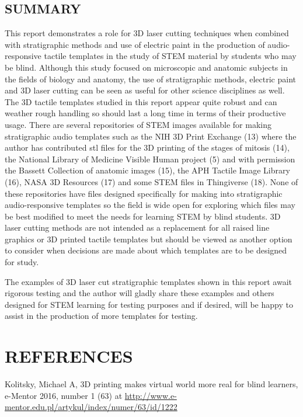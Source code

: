 \documentclass[11.5pt]{sig-alternate} %
\begin{document}
\begin{large}
\section*{SUMMARY}
This report demonstrates a role for 3D laser cutting techniques when combined with stratigraphic methods and use of electric paint in the production of audio-responsive tactile templates in the study of STEM material by students who may be blind.  Although this study focused on microscopic and anatomic subjects in the fields of biology and anatomy, the use of stratigraphic methods, electric paint and 3D laser cutting can be seen as useful for other science disciplines as well.  The 3D tactile templates studied in this report appear quite robust and can weather rough handling so should last a long time in terms of their productive usage.  There are several repositories of STEM images available for making stratigraphic audio templates such as the NIH 3D Print Exchange (13) where the author has contributed stl files for the 3D printing of the stages of mitosis (14), the National Library of Medicine Visible Human project (5) and with permission the Bassett Collection of anatomic images (15), the APH Tactile Image Library (16), NASA 3D Resources (17) and some STEM files in Thingiverse (18).  None of these repositories have files designed specifically for making into stratigraphic audio-responsive templates so the field is wide open for exploring which files may be best modified to meet the needs for learning STEM by blind students.  3D laser cutting methods are not intended as a replacement for all raised line graphics or 3D printed tactile templates but should be viewed as another option to consider when decisions are made about which templates are to be designed for study.

The examples of 3D laser cut stratigraphic templates shown in this report await rigorous testing and the author will gladly share these examples and others designed for STEM learning for testing purposes and if desired, will be happy to assist in the production of more templates for testing.


\end{large}
\clearpage
\section*{REFERENCES}\par 

\leftskip 0.25in
\parindent -0.25in 
Kolitsky, Michael A, 3D printing makes virtual world more real for blind learners, e-Mentor 2016, number 1 (63) at \url{http://www.e-mentor.edu.pl/artykul/index/numer/63/id/1222}
\end{document}
